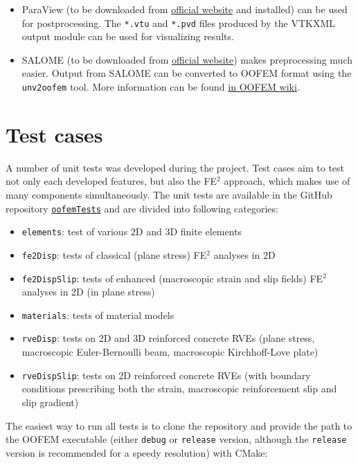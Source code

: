 \documentclass[11pt]{article}
\begin{document}
\begin{itemize}
    \item ParaView (to be downloaded from \href{https://www.paraview.org/}{official website} and installed) can be used for postprocessing. The \texttt{*.vtu} and \texttt{*.pvd} files produced by the VTKXML output module can be used for visualizing results.

    \item SALOME (to be downloaded from \href{https://www.salome-platform.org/}{official website}) makes preprocessing much easier. Output from SALOME can be converted to OOFEM format using the \texttt{unv2oofem} tool. More information can be found \href{http://www.oofem.org/wiki/doku.php?id=unv2oofem:unv2oofem}{in OOFEM wiki}.
\end{itemize}

\clearpage
\section{Test cases}

A number of unit tests was developed during the project. 
Test cases aim to test not only each developed features, but also the FE$^2$ approach,
which makes use of many components simultaneously.
The unit tests are available in the GitHub repository \href{https://github.com/adsci/oofemTests}{\texttt{oofemTests}} and are divided into following categories:

\begin{itemize}
    \item \texttt{elements}: test of various 2D and 3D finite elements
    \item \texttt{fe2Disp}: tests of classical (plane stress) FE$^2$ analyses in 2D 
    \item \texttt{fe2DispSlip}: tests of enhanced (macroscopic strain and slip fields) FE$^2$ analyses in 2D (in plane stress)
    \item \texttt{materials}: tests of material models 
    \item \texttt{rveDisp}: tests on 2D and 3D reinforced concrete RVEs (plane stress, macroscopic Euler-Bernoulli beam, macroscopic Kirchhoff-Love plate)
    \item \texttt{rveDispSlip}: tests on 2D reinforced concrete RVEs (with boundary conditions prescribing both the strain, macroscopic reinforcement slip and slip gradient)
\end{itemize}

\noindent The easiest way to run all tests is to clone the repository and provide the path to the OOFEM executable (either \texttt{debug} or \texttt{release} version, although the \texttt{release} version is recommended for a speedy resolution) with CMake: 
\end{document}
